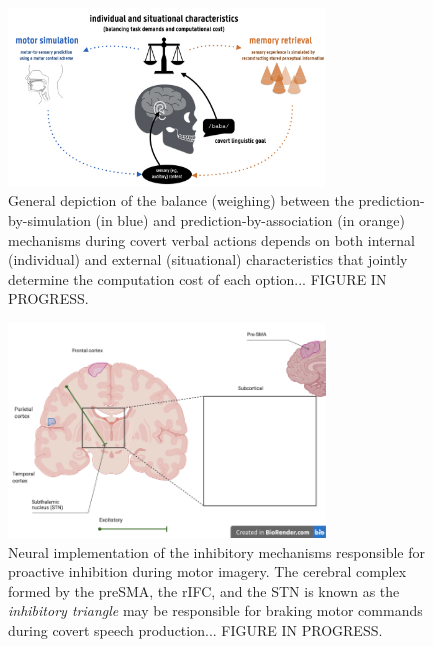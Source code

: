 \documentclass[utf8]{template/frontiersSCNS} %
\begin{document}
\begin{figure}[ht] %
\begin{center}
\includegraphics[width=0.75\textwidth]{figures/simulation_association.png} %
\end{center}
\caption{General depiction of the balance (weighing) between the prediction-by-simulation (in blue) and prediction-by-association (in orange) mechanisms during covert verbal actions depends on both internal (individual) and external (situational) characteristics that jointly determine the computation cost of each option... FIGURE IN PROGRESS.}\label{fig:1}
\end{figure}

\begin{figure}[ht] %
\begin{center}
\includegraphics[width=0.75\textwidth]{figures/inhibitory_triangle.png} %
\end{center}
\caption{Neural implementation of the inhibitory mechanisms responsible for proactive inhibition during motor imagery. The cerebral complex formed by the preSMA, the rIFC, and the STN is known as the \textit{inhibitory triangle} may be responsible for braking motor commands during covert speech production... FIGURE IN PROGRESS.}\label{fig:2}
\end{figure}

\end{document}
